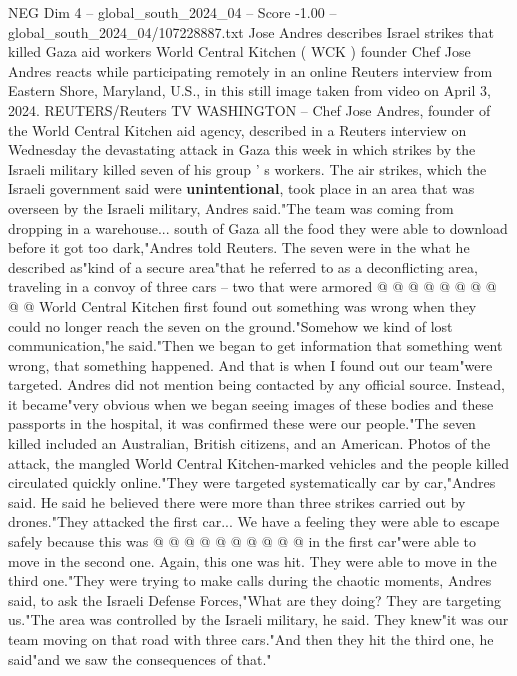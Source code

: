 \begin{textsample}{NEG Dim 4 – global\_south\_2024\_04 – Score -1.00 – global\_south\_2024\_04/107228887.txt}  \label{ex:f4_neg_191}
Jose Andres describes Israel strikes that killed Gaza aid workers World Central Kitchen ( WCK ) founder Chef Jose Andres reacts while participating remotely in an online Reuters interview from Eastern Shore, Maryland, U.S., in this still image taken from video on April 3, 2024.
REUTERS/Reuters TV WASHINGTON -- Chef Jose Andres, founder of the World Central Kitchen aid agency, described in a Reuters interview on Wednesday the devastating attack in Gaza this week in which strikes by the Israeli military killed seven of his group ' s workers.
The air strikes, which the Israeli government said were \textbf{unintentional}, took place in an area that was overseen by the Israeli military, Andres said."The team was coming from dropping in a warehouse... south of Gaza all the food they were able to download before it got too dark,"Andres told Reuters.
The seven were in the what he described as"kind of a secure area"that he referred to as a deconflicting area, traveling in a convoy of three cars -- two that were armored @ @ @ @ @ @ @ @ @ @ World Central Kitchen first found out something was wrong when they could no longer reach the seven on the ground."Somehow we kind of lost communication,"he said."Then we began to get information that something went wrong, that something happened.
And that is when I found out our team"were targeted.
Andres did not mention being contacted by any official source.
Instead, it became"very obvious when we began seeing images of these bodies and these passports in the hospital, it was confirmed these were our people."The seven killed included an Australian, British citizens, and an American.
Photos of the attack, the mangled World Central Kitchen-marked vehicles and the people killed circulated quickly online."They were targeted systematically car by car,"Andres said.
He said he believed there were more than three strikes carried out by drones."They attacked the first car...
We have a feeling they were able to escape safely because this was @ @ @ @ @ @ @ @ @ @ in the first car"were able to move in the second one.
Again, this one was hit.
They were able to move in the third one."They were trying to make calls during the chaotic moments, Andres said, to ask the Israeli Defense Forces,"What are they doing?
They are targeting us."The area was controlled by the Israeli military, he said.
They knew"it was our team moving on that road with three cars."And then they hit the third one, he said"and we saw the consequences of that."

\end{textsample}
